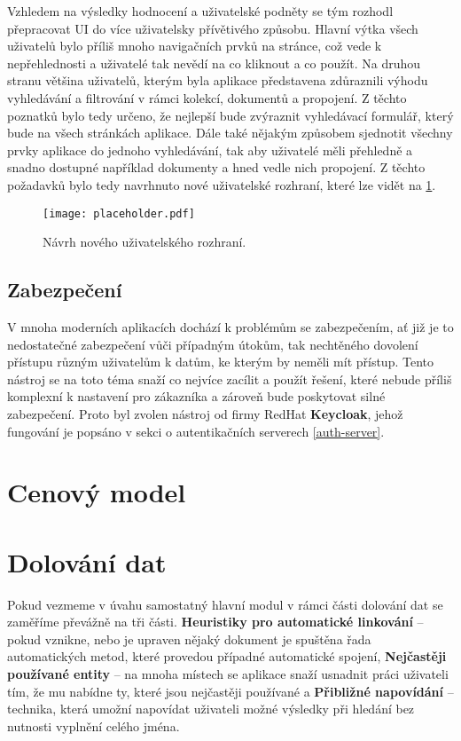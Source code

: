 \par Vzhledem na výsledky hodnocení a uživatelské podněty se tým rozhodl přepracovat UI do více uživatelsky přívětivého způsobu. Hlavní výtka všech uživatelů bylo příliš mnoho navigačních prvků na stránce, což vede k nepřehlednosti a uživatelé tak nevědí na co kliknout a co použít. Na druhou stranu většina uživatelů, kterým byla aplikace představena zdůraznili výhodu vyhledávání a filtrování v rámci kolekcí, dokumentů a propojení. Z těchto poznatků bylo tedy určeno, že nejlepší bude zvýraznit vyhledávací formulář, který bude na všech stránkách aplikace. Dále také nějakým způsobem sjednotit všechny prvky aplikace do jednoho vyhledávání, tak aby uživatelé měli přehledně a snadno dostupné například dokumenty a hned vedle nich propojení. Z těchto požadavků bylo tedy navrhnuto nové uživatelské rozhraní, které lze vidět na \ref{new-ui}.

\begin{figure}[htp]
  \centering
  \texttt{[image: placeholder.pdf]}
  \caption{Návrh nového uživatelského rozhraní.}
  \label{new-ui}
\end{figure}

\subsection{Zabezpečení}
\par V mnoha moderních aplikacích dochází k problémům se zabezpečením, ať již je to nedostatečné zabezpečení vůči případným útokům, tak nechtěného dovolení přístupu různým uživatelům k datům, ke kterým by neměli mít přístup. Tento nástroj se na toto téma snaží co nejvíce zacílit a použít řešení, které nebude příliš komplexní k nastavení pro zákazníka a zároveň bude poskytovat silné zabezpečení. Proto byl zvolen nástroj od firmy RedHat \textbf{Keycloak}, jehož fungování je popsáno v sekci o autentikačních serverech \ref{auth-server}.

\section{Cenový model}

\section{Dolování dat}
\par Pokud vezmeme v úvahu samostatný hlavní modul v rámci části dolování dat se zaměříme převážně na tři části. \textbf{Heuristiky pro automatické linkování} -- pokud vznikne, nebo je upraven nějaký dokument je spuštěna řada automatických metod, které provedou případné automatické spojení, \textbf{Nejčastěji používané entity} -- na mnoha místech se aplikace snaží usnadnit práci uživateli tím, že mu nabídne ty, které jsou nejčastěji používané a \textbf{Přibližné napovídání} -- technika, která umožní napovídat uživateli možné výsledky při hledání bez nutnosti vyplnění celého jména.

